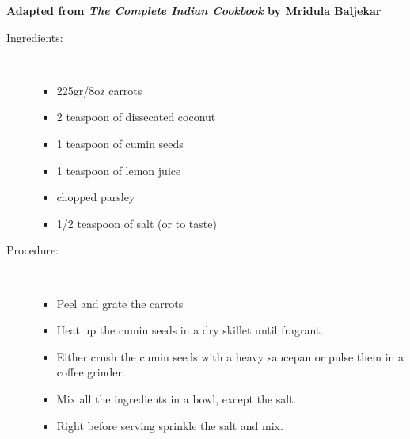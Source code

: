 \documentclass[11pt,letterpaper]{article}
\begin{document}


\begin{flushright}
{\bf Adapted from {\it The Complete Indian Cookbook} by Mridula Baljekar}
\end{flushright}

\begin{description}

\item[Ingredients:]\ \\
	\begin{itemize}
	\item 225gr/8oz carrots
	\item 2 teaspoon of dissecated coconut
	\item 1 teaspoon of cumin seeds
	\item 1 teaspoon of lemon juice
	\item chopped parsley 
	\item 1/2 teaspoon of salt (or to taste)
	\end{itemize}

\item[Procedure:]\ \\
	\begin{itemize}
	\item Peel and grate the carrots
	\item Heat up the cumin seeds in a dry skillet until fragrant.
	\item Either crush the cumin seeds with a heavy saucepan or pulse them in a coffee grinder.
	\item  Mix all the ingredients in a bowl, except the salt.
	\item Right before serving sprinkle the salt and mix.
		\end{itemize}

\end{description}
\end{document}

